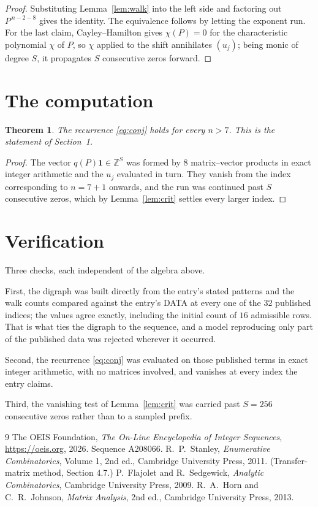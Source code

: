 \documentclass[11pt,a4paper]{article}
\theoremstyle{plain}
\newtheorem{theorem}{Theorem}
\theoremstyle{definition}
\begin{document}
\begin{proof}
Substituting Lemma~\ref{lem:walk} into the left side and factoring out
$P^{\,n-2-8}$ gives the identity. The equivalence follows by letting the exponent
run. For the last claim, Cayley--Hamilton gives $\chi(P)=0$ for the characteristic
polynomial $\chi$ of $P$, so $\chi$ applied to the shift annihilates $(u_j)$; being monic of
degree $S$, it propagates $S$ consecutive zeros forward.
\end{proof}

\section{The computation}

\begin{theorem}
The recurrence \eqref{eq:conj} holds for every $n>7$. This is the statement of
Section~1.
\end{theorem}

\begin{proof}
The vector $q(P)\mathbf{1}\in\mathbb{Z}^{S}$ was formed by $8$ matrix--vector
products in exact integer arithmetic and the $u_j$ evaluated in turn. They vanish from the
index corresponding to $n=7+1$ onwards, and the run was continued past $S$ consecutive
zeros, which by Lemma~\ref{lem:crit} settles every larger index.
\end{proof}

\section{Verification}

Three checks, each independent of the algebra above.

First, the digraph was built directly from the entry's stated patterns and the walk counts
compared against the entry's DATA at every one of the $32$ published indices; the
values agree exactly, including the initial count of $16$ admissible rows. That is
what ties the digraph to the sequence, and a model reproducing only part of the published
data was rejected wherever it occurred.

Second, the recurrence \eqref{eq:conj} was evaluated on those published terms in exact
integer arithmetic, with no matrices involved, and vanishes at every index the entry claims.

Third, the vanishing test of Lemma~\ref{lem:crit} was carried past $S=256$ consecutive
zeros rather than to a sampled prefix.

\begin{thebibliography}{9}
 The OEIS Foundation, \emph{The On-Line Encyclopedia of Integer
Sequences}, \url{https://oeis.org}, 2026. Sequence A208066.
 R.~P.~Stanley, \emph{Enumerative Combinatorics}, Volume 1, 2nd ed.,
Cambridge University Press, 2011. (Transfer-matrix method, Section 4.7.)
 P.~Flajolet and R.~Sedgewick, \emph{Analytic Combinatorics}, Cambridge
University Press, 2009.
 R.~A.~Horn and C.~R.~Johnson, \emph{Matrix Analysis}, 2nd ed., Cambridge
University Press, 2013.
\end{thebibliography}
\end{document}
